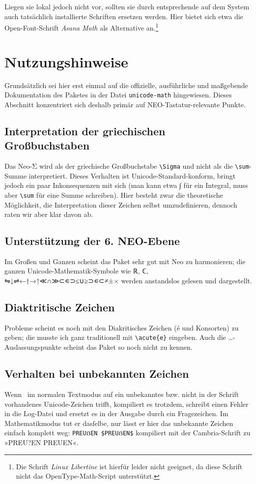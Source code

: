 \documentclass{scrartcl}
\begin{document}
Liegen sie lokal jedoch nicht vor, sollten sie durch entsprechende auf dem System auch tatsächlich installierte Schriften ersetzen werden. Hier bietet sich etwa die Open-Font-Schrift \emph{Asana Math} als Alternative an.\footnote{Die Schrift \emph{Linux Libertine} ist hierfür leider nicht geeignet, da diese Schrift nicht das OpenType-Math-Script unterstützt.}

\section{Nutzungshinweise}
Grundsätzlich sei hier erst einmal auf die offizielle, ausführliche und maßgebende Dokumentation des Paketes in der Datei \verb|unicode-math| hingewiesen. Dieses Abschnitt konzentriert sich deshalb primär auf NEO-Tastatur-relevante Punkte.

\subsection{Interpretation der griechischen Großbuchstaben}
Das Neo-Σ wird als der griechische Großbuchstabe \verb|\Sigma| und nicht als die \verb|\sum|-Summe interpretiert. Dieses Verhalten ist Unicode-Standard-konform, bringt jedoch ein paar Inkonsequenzen mit sich (man kann etwa ∫ für ein Integral, muss aber \verb|\sum| für eine Summe schreiben). Hier besteht zwar die theoretische Möglichkeit, die Interpretation dieser Zeichen selbst umzudefinieren, dennoch raten wir aber klar davon ab.

\subsection{Unterstützung der 6. NEO-Ebene}
Im Großen und Ganzen scheint das Paket sehr gut mit Neo zu harmonieren; die ganzen Unicode-Mathematik-Symbole wie ℝ, ℂ, ⇋↓⇌←†→↑≪∩≫⊂∊⊃≤∪≥⊃∊⊂≠±× werden anstandslos gelesen und dargestellt.

\subsection{Diaktritische Zeichen}
Probleme scheint es noch mit den Diakritisches Zeichen (é und Konsorten) zu geben; die musste ich ganz traditionell mit \verb|\acute{e}| eingeben. Auch die …-Auslassungspunkte scheint das Paket so noch nicht zu kennen.

\subsection{Verhalten bei unbekannten Zeichen}
Wenn \XeTeX\ im normalen Textmodus auf ein unbekanntes bzw. nicht in der Schrift vorhandenes Unicode-Zeichen trifft, kompiliert es trotzdem, schreibt einen Fehler in die Log-Datei und ersetzt es in der Ausgabe durch ein Fragezeichen. Im Mathematikmodus tut er dasſelbe, nur lässt er hier das unbekannte Zeichen einfach komplett weg: \verb|PREUẞEN $PREUẞEN$| kompiliert mit der Cambria-Schrift zu »PREU?EN PREUEN«.
\end{document}
